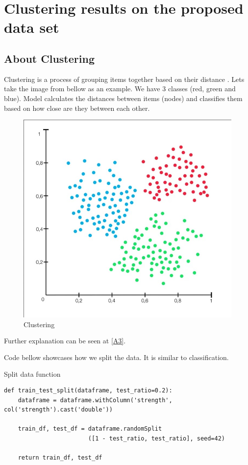 \section{Clustering results on the proposed data set}\label{Clustering}

\subsection{About Clustering}

Clustering is a process of grouping items together based on their distance \parencite{likas2003global}. Lets take the image from bellow as an example. We have 3 classes (red, green and blue). Model calculates the distances between items (nodes) and classifies them based on how close are they between each other.

\begin{figure}[H]
    \includegraphics[scale=0.30]{img/Clustering/Clustering.jpg}
    \centering
    \caption{Clustering \parencite{web:Rocketloop}}
    \label{fig:clustering}
\end{figure}

Further explanation can be seen at \ref{A3}.

Code bellow showcases how we split the data. It is similar to classification.
\begin{listing}[H]
\caption{Split data function}
\begin{verbatim}
def train_test_split(dataframe, test_ratio=0.2):
    dataframe = dataframe.withColumn('strength', col('strength').cast('double'))

    train_df, test_df = dataframe.randomSplit
                        ([1 - test_ratio, test_ratio], seed=42)

    return train_df, test_df
\end{verbatim}
\end{listing}

